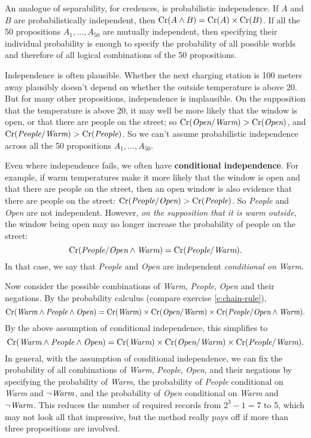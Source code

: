 An analogue of separability, for credences, is probabilistic
independence. If $A$ and $B$ are probabilistically independent, then
$\text{Cr}(A\land B) = \text{Cr}(A) \times \text{Cr}(B)$. If all the 50 propositions
$A_1,\ldots,A_{50}$ are mutually independent,
then specifying their individual probability is enough to specify the
probability of all possible worlds and therefore of all logical
combinations of the 50 propositions.

Independence is often plausible. Whether the next charging station is
100 meters away plausibly doesn't depend on whether the outside
temperature is above 20\celsius. But for many other propositions,
independence is implausible. On the supposition that the temperature
is above 20\celsius, it may well be more likely that the window is
open, or that there are people on the street; so
$\text{Cr}(\emph{Open}/\emph{Warm}) > \text{Cr}(\emph{Open})$, and
$\text{Cr}(\emph{People}/\emph{Warm}) > \text{Cr}(\emph{People})$. So we can't
assume probabilistic independence across all the 50 propositions $A_1,\ldots,A_{50}$.

Even where independence fails, we often have \textbf{conditional independence}. For example,
if warm temperatures make it more likely that the window is open and
that there are people on the street, then an open window is also evidence
that there are people on the street: $\text{Cr}(\emph{People}/\emph{Open}) >
\text{Cr}(\emph{People})$.  So \emph{People} and \emph{Open} are not
independent. However, \emph{on the supposition that it is warm
  outside}, the window being open may no longer increase the
probability of people on the street:
\[
\text{Cr}(\emph{People}/\emph{Open} \land \emph{Warm}) = \text{Cr}(\emph{People}/
\emph{Warm}).
\]
In that case, we say that \emph{People} and \emph{Open} are
independent \emph{conditional on} \emph{Warm}.

Now consider the possible combinations of \emph{Warm}, \emph{People},
\emph{Open} and their negations. By the probability calculus (compare
exercise \ref{e:chain-rule}),
\[
\text{Cr}(\emph{Warm} \land \emph{People} \land \emph{Open}) = 
\text{Cr}(\emph{Warm}) \times \text{Cr}(\emph{Open}/\emph{Warm}) \times \text{Cr}(\emph{People}/\emph{Open} \land \emph{Warm}).
\]
By the above assumption of conditional independence, this simplifies to
\[
\text{Cr}(\emph{Warm} \land \emph{People} \land \emph{Open}) = 
\text{Cr}(\emph{Warm}) \times \text{Cr}(\emph{Open}/\emph{Warm}) \times \text{Cr}(\emph{People}/\emph{Warm}).
\]
In general, with the assumption of conditional independence, we can
fix the probability of all combinations of \emph{Warm}, \emph{People},
\emph{Open}, and their negations by specifying the probability of
\emph{Warm}, the probability of \emph{People} conditional on
\emph{Warm} and $\neg\emph{Warm}$, and the probability of \emph{Open}
conditional on \emph{Warm} and $\neg\emph{Warm}$.  This reduces the
number of required records from $2^3-1 = 7$ to 5, which may not look
all that impressive, but the method really pays off if more than three
propositions are involved.

